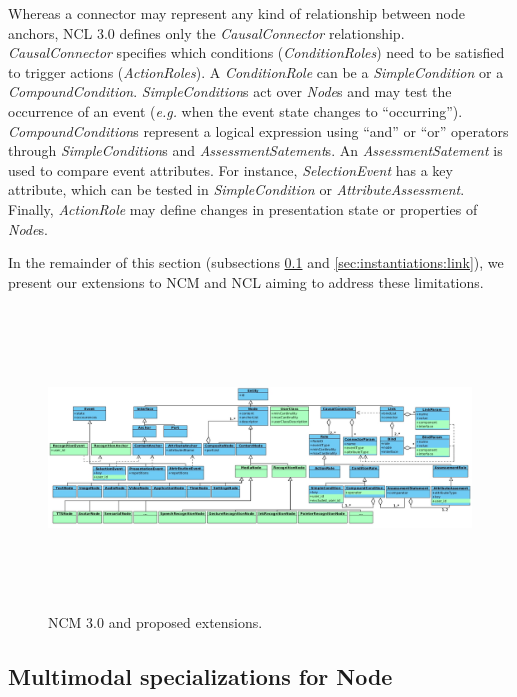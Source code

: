 \documentclass[
  doutorado,
  american
]{ThesisPUC}
\begin{document}
Whereas a connector may represent any kind of relationship between node anchors,
NCL 3.0 defines only the \textit{CausalConnector} relationship. 
\textit{CausalConnector} specifies which conditions (\textit{ConditionRoles})
need to be satisfied to trigger actions (\textit{ActionRoles}). A
\textit{ConditionRole} can be a \textit{SimpleCondition} or a
\textit{CompoundCondition}. \textit{SimpleCondition}s act over \textit{Node}s 
and may test the occurrence of an event (\textit{e.g.} when the event state 
changes to “occurring”). \textit{CompoundCondition}s represent a logical 
expression using “and” or “or” operators through \textit{SimpleCondition}s and
\textit{AssessmentSatement}s. An \textit{AssessmentSatement} is used to compare 
event attributes. For instance, \textit{SelectionEvent} has a key attribute, 
which can be tested in \textit{SimpleCondition} or 
\textit{AttributeAssessment}. Finally, \textit{ActionRole} may define changes 
in presentation state or properties of \textit{Node}s.

In the remainder of this section (subsections \ref{sec:instantiation:node} 
and \ref{sec:instantiations:link}), we present our extensions to NCM and NCL 
aiming to address these limitations.

\begin{landscape}
\begin{figure}
	\begin{center}
		\includegraphics[height=8cm, keepaspectratio]{img/img11.png}
		\caption{NCM 3.0 and proposed extensions.}
		\label{fig:ncm}
	\end{center}
\end{figure}
\end{landscape}

\subsection{Multimodal specializations for Node}
\label{sec:instantiation:node}
\end{document}
